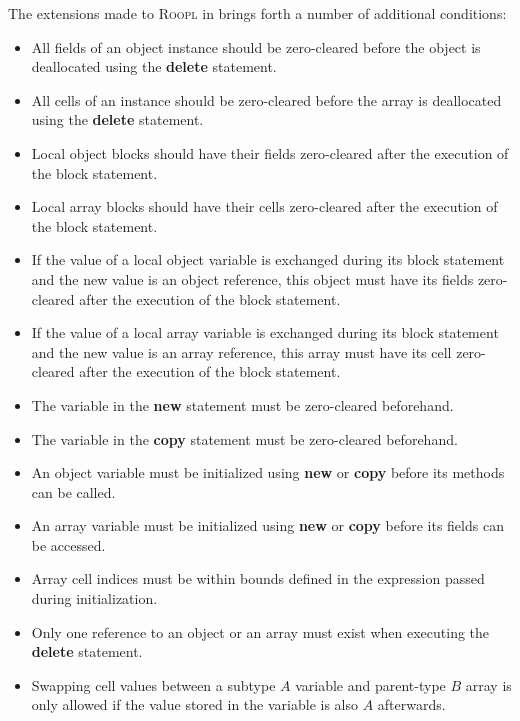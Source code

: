 The extensions made to \textsc{Roopl} in \rooplpp brings forth a number of additional conditions:

\begin{itemize}
    \item All fields of an object instance should be zero-cleared before the object is deallocated using the \textbf{delete} statement.
    \item All cells of an instance should be zero-cleared before the array is deallocated using the \textbf{delete} statement.
    \item Local object blocks should have their fields zero-cleared after the execution of the block statement.
    \item Local array blocks should have their cells zero-cleared after the execution of the block statement.
    \item If the value of a local object variable is exchanged during its block statement and the new value is an object reference, this object must have its fields zero-cleared after the execution of the block statement.
    \item If the value of a local array variable is exchanged during its block statement and the new value is an array reference, this array must have its cell zero-cleared after the execution of the block statement.
    \item The variable in the \textbf{new} statement must be zero-cleared beforehand.
    \item The variable in the \textbf{copy} statement must be zero-cleared beforehand.
    \item An object variable must be initialized using \textbf{new} or \textbf{copy} before its methods can be called.
    \item An array variable must be initialized using \textbf{new} or \textbf{copy} before its fields can be accessed.
    \item Array cell indices must be within bounds defined in the expression passed during initialization.
    \item Only one reference to an object or an array must exist when executing the \textbf{delete} statement.
    \item Swapping cell values between a subtype $A$ variable and parent-type $B$ array is only allowed if the value stored in the variable is also $A$ afterwards.
\end{itemize}

